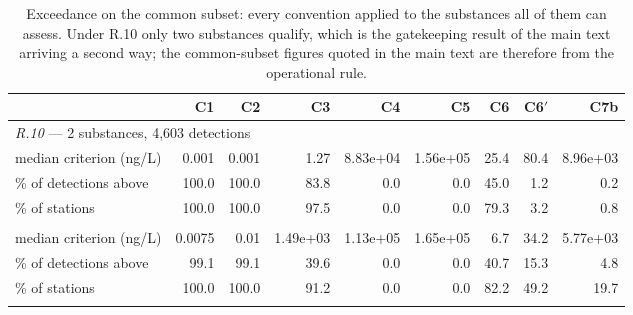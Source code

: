 \begin{table}[htbp]\centering\scriptsize\setlength{\tabcolsep}{2.4pt}
\caption{Exceedance on the common subset: every convention applied to the substances all of them can assess. Under R.10 only two substances qualify, which is the gatekeeping result of the main text arriving a second way; the common-subset figures quoted in the main text are therefore from the operational rule.}
\label{tab:s3}
\begin{tabular}{lrrrrrrrr}\toprule
& C1 & C2 & C3 & C4 & C5 & C6 & C6$'$ & C7b\\\midrule
\multicolumn{9}{l}{\emph{R.10} --- 2 substances, 4,603 detections}\\
median criterion (ng/L) & 0.001 & 0.001 & 1.27 & 8.83e+04 & 1.56e+05 & 25.4 & 80.4 & 8.96e+03\\
\% of detections above & 100.0 & 100.0 & 83.8 & 0.0 & 0.0 & 45.0 & 1.2 & 0.2\\
\% of stations & 100.0 & 100.0 & 97.5 & 0.0 & 0.0 & 79.3 & 3.2 & 0.8\\\addlinespace
\multicolumn{9}{l}{\emph{operational} --- 6 substances, 9,755 detections}\\
median criterion (ng/L) & 0.0075 & 0.01 & 1.49e+03 & 1.13e+05 & 1.65e+05 & 6.7 & 34.2 & 5.77e+03\\
\% of detections above & 99.1 & 99.1 & 39.6 & 0.0 & 0.0 & 40.7 & 15.3 & 4.8\\
\% of stations & 100.0 & 100.0 & 91.2 & 0.0 & 0.0 & 82.2 & 49.2 & 19.7\\\addlinespace
\bottomrule\end{tabular}\end{table}
